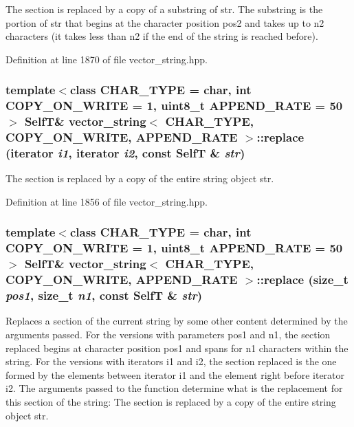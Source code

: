 The section is replaced by a copy of a substring of str. The substring is the portion of str that begins at the character position pos2 and takes up to n2 characters (it takes less than n2 if the end of the string is reached before). 

Definition at line 1870 of file vector\_\-string.hpp.\hypertarget{classvector__string_f5d63c2c0b023d1719ef9cd0a94e4e7d}{
\subsubsection[{replace}]{\setlength{\rightskip}{0pt plus 5cm}template$<$class CHAR\_\-TYPE  = char, int COPY\_\-ON\_\-WRITE = 1, uint8\_\-t APPEND\_\-RATE = 50$>$ {\bf SelfT}\& {\bf vector\_\-string}$<$ CHAR\_\-TYPE, COPY\_\-ON\_\-WRITE, APPEND\_\-RATE $>$::replace (iterator {\em i1}, \/  iterator {\em i2}, \/  const {\bf SelfT} \& {\em str})}}
\label{classvector__string_f5d63c2c0b023d1719ef9cd0a94e4e7d}


The section is replaced by a copy of the entire string object str. 

Definition at line 1856 of file vector\_\-string.hpp.\hypertarget{classvector__string_9ee659752a1293cc78baf7212aa25ed8}{
\subsubsection[{replace}]{\setlength{\rightskip}{0pt plus 5cm}template$<$class CHAR\_\-TYPE  = char, int COPY\_\-ON\_\-WRITE = 1, uint8\_\-t APPEND\_\-RATE = 50$>$ {\bf SelfT}\& {\bf vector\_\-string}$<$ CHAR\_\-TYPE, COPY\_\-ON\_\-WRITE, APPEND\_\-RATE $>$::replace (size\_\-t {\em pos1}, \/  size\_\-t {\em n1}, \/  const {\bf SelfT} \& {\em str})}}
\label{classvector__string_9ee659752a1293cc78baf7212aa25ed8}


Replaces a section of the current string by some other content determined by the arguments passed. For the versions with parameters pos1 and n1, the section replaced begins at character position pos1 and spans for n1 characters within the string. For the versions with iterators i1 and i2, the section replaced is the one formed by the elements between iterator i1 and the element right before iterator i2. The arguments passed to the function determine what is the replacement for this section of the string: The section is replaced by a copy of the entire string object str. 

